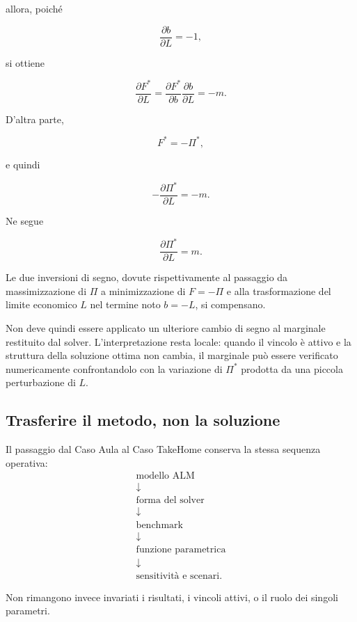 \noindent allora, poich\'e

\[
\frac{\partial b}{\partial L}=-1,
\]

\noindent si ottiene

\[
\frac{\partial F^*}{\partial L}
=
\frac{\partial F^*}{\partial b}
\frac{\partial b}{\partial L}
=
-m.
\]

D'altra parte,

\[
F^*=-\Pi^*,
\]

\noindent e quindi

\[
-\frac{\partial\Pi^*}{\partial L}
=
-m.
\]

Ne segue

\[
\boxed{
\frac{\partial\Pi^*}{\partial L}
=
m
}.
\]

Le due inversioni di segno, dovute rispettivamente al passaggio da
massimizzazione di \(\Pi\) a minimizzazione di \(F=-\Pi\) e alla trasformazione
del limite economico \(L\) nel termine noto \(b=-L\), si compensano.

Non deve quindi essere applicato un ulteriore cambio di segno al marginale
restituito dal solver. L'interpretazione resta locale: quando il vincolo \`e
attivo e la struttura della soluzione ottima non cambia, il marginale pu\`o
essere verificato numericamente confrontandolo con la variazione di
\(\Pi^*\) prodotta da una piccola perturbazione di \(L\).


\subsection{Trasferire il metodo, non la soluzione}

Il passaggio dal Caso Aula al Caso TakeHome conserva la stessa sequenza
operativa:
\vspace{-0.3cm}
\begin{gather*}
\text{modello ALM}\\
\downarrow\\
\text{forma del solver}\\
\downarrow\\
\text{benchmark}\\
\downarrow\\
\text{funzione parametrica}\\
\downarrow\\
\text{sensitivit\`a e scenari}.
\end{gather*}


Non rimangono invece invariati i risultati, i vincoli attivi, o il ruolo dei
singoli parametri.

